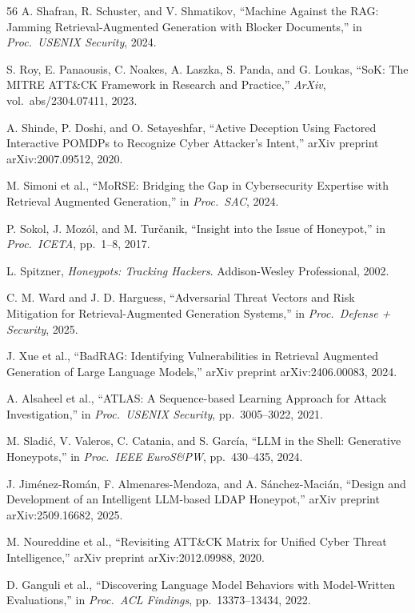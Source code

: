 \begin{thebibliography}{56}
 A. Shafran, R. Schuster, and V. Shmatikov, ``Machine Against the RAG: Jamming Retrieval-Augmented Generation with Blocker Documents,'' in \emph{Proc.\ USENIX Security}, 2024.

 S. Roy, E. Panaousis, C. Noakes, A. Laszka, S. Panda, and G. Loukas, ``SoK: The MITRE ATT\&CK Framework in Research and Practice,'' \emph{ArXiv}, vol.~abs/2304.07411, 2023.

 A. Shinde, P. Doshi, and O. Setayeshfar, ``Active Deception Using Factored Interactive POMDPs to Recognize Cyber Attacker's Intent,'' arXiv preprint arXiv:2007.09512, 2020.

 M. Simoni et al., ``MoRSE: Bridging the Gap in Cybersecurity Expertise with Retrieval Augmented Generation,'' in \emph{Proc.\ SAC}, 2024.

 P. Sokol, J. Moz\'ol, and M. Tur\v{c}anik, ``Insight into the Issue of Honeypot,'' in \emph{Proc.\ ICETA}, pp.~1--8, 2017.

 L. Spitzner, \emph{Honeypots: Tracking Hackers}. Addison-Wesley Professional, 2002.

 C. M. Ward and J. D. Harguess, ``Adversarial Threat Vectors and Risk Mitigation for Retrieval-Augmented Generation Systems,'' in \emph{Proc.\ Defense + Security}, 2025.

 J. Xue et al., ``BadRAG: Identifying Vulnerabilities in Retrieval Augmented Generation of Large Language Models,'' arXiv preprint arXiv:2406.00083, 2024.

 A. Alsaheel et al., ``ATLAS: A Sequence-based Learning Approach for Attack Investigation,'' in \emph{Proc.\ USENIX Security}, pp.~3005--3022, 2021.

 M. Sladi\'c, V. Valeros, C. Catania, and S. Garc\'ia, ``LLM in the Shell: Generative Honeypots,'' in \emph{Proc.\ IEEE EuroS\&PW}, pp.~430--435, 2024.

 J. Jim\'enez-Rom\'an, F. Almenares-Mendoza, and A. S\'anchez-Maci\'an, ``Design and Development of an Intelligent LLM-based LDAP Honeypot,'' arXiv preprint arXiv:2509.16682, 2025.

 M. Noureddine et al., ``Revisiting ATT\&CK Matrix for Unified Cyber Threat Intelligence,'' arXiv preprint arXiv:2012.09988, 2020.

 D. Ganguli et al., ``Discovering Language Model Behaviors with Model-Written Evaluations,'' in \emph{Proc.\ ACL Findings}, pp.~13373--13434, 2022.


\end{thebibliography}
